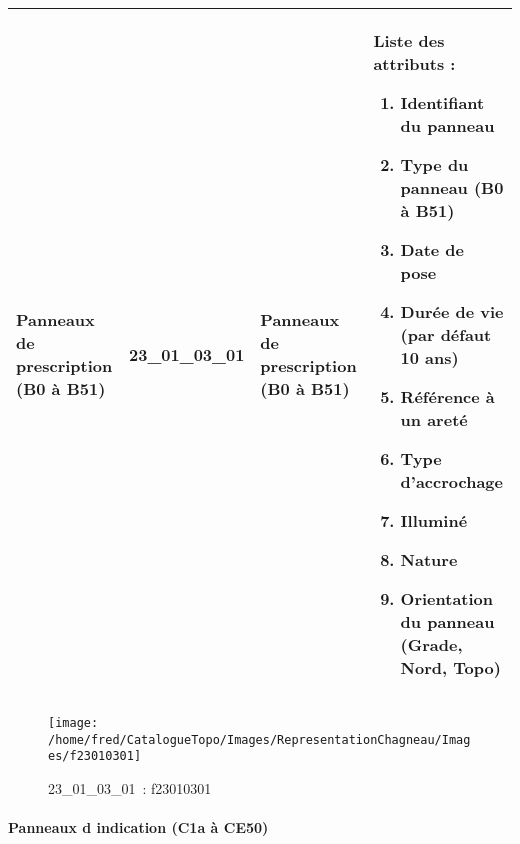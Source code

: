 \documentclass[12pt,titlepage]{book}
\begin{document}
\renewcommand{\arraystretch}{1.2}
\begin{supertabular}{|p{10cm}|c|p{13cm}|p{12cm}|}
 Panneaux de prescription (B0 à B51) & 23\_01\_03\_01 & Panneaux de prescription (B0 à B51) & Liste des attributs :
\begin{enumerate}
  \item Identifiant du panneau  \item Type du panneau (B0 à B51)  \item Date de pose  \item Durée de vie (par défaut 10 ans)  \item Référence à un areté  \item Type d'accrochage  \item Illuminé  \item Nature  \item Orientation du panneau (Grade, Nord, Topo)\end{enumerate}
\\
\hline
\end{supertabular}
\begin{figure}[h!]
  \hfill         %
  \begin{minipage}[t]{3cm}
    \begin{center}
      \texttt{[image: /home/fred/CatalogueTopo/Images/RepresentationChagneau/Images/f23010301]}
      \caption[~23\_01\_03\_01]{\small{23\_01\_03\_01~:} \tiny{f23010301}}\label{f23010301}
    \end{center}
  \end{minipage}
\end{figure}


\paragraph{Panneaux d indication (C1a à CE50)}
\noindent
\vspace{\baselineskip}
\end{document}
